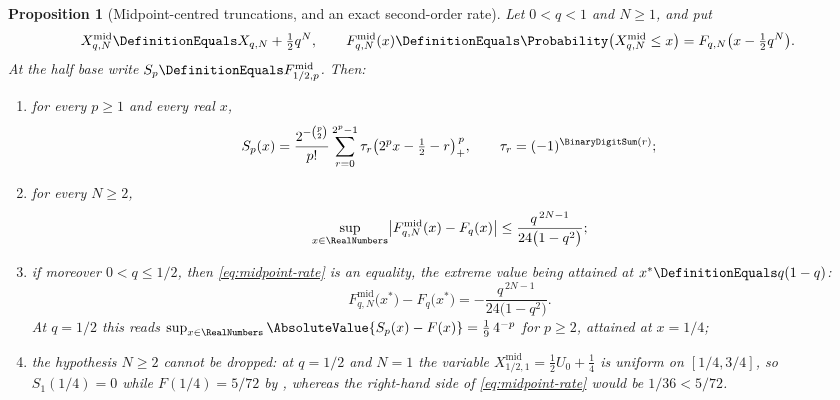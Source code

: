 \documentclass[11pt,a4paper,oneside,openany]{book}
\newtheorem{proposition}[proposition]{Proposition}
\theoremstyle{definition}
\theoremstyle{remark}
\begin{document}
\begin{proposition}[Midpoint-centred truncations, and an exact second-order rate]\label{prop:midpoint-truncation}
Let $0<q<1$ and $N\ge1$, and put
\begin{equation}\label{eq:midpoint-truncation-def}
 X_{q,N}^{\mathrm{mid}}\DefinitionEquals X_{q,N}+\tfrac12q^N,
 \qquad
 F_{q,N}^{\mathrm{mid}}(x)\DefinitionEquals\Probability\bigl(X_{q,N}^{\mathrm{mid}}\le x\bigr)
  =F_{q,N}\bigl(x-\tfrac12q^N\bigr).
\end{equation}
At the half base write $S_p\DefinitionEquals F^{\mathrm{mid}}_{1/2,p}$.  Then:
\begin{enumerate}
\item for every $p\ge1$ and every real $x$,
\begin{equation}\label{eq:midpoint-spline}
 S_p(x)=\frac{2^{-\binom p2}}{p!}
  \sum_{r=0}^{2^p-1}\tau_r\bigl(2^px-\tfrac12-r\bigr)_+^{\,p},
 \qquad \tau_r=(-1)^{\BinaryDigitSum(r)};
\end{equation}
\item for every $N\ge2$,
\begin{equation}\label{eq:midpoint-rate}
 \sup_{x\in\RealNumbers}\bigl|F^{\mathrm{mid}}_{q,N}(x)-F_q(x)\bigr|
 \le\frac{q^{\,2N-1}}{24\bigl(1-q^{2}\bigr)};
\end{equation}
\item if moreover $0<q\le1/2$, then \eqref{eq:midpoint-rate} is an equality, the
extreme value being attained at $x^\ast\DefinitionEquals q(1-q)$:
\begin{equation}\label{eq:midpoint-extremum}
 F^{\mathrm{mid}}_{q,N}\bigl(x^\ast\bigr)-F_q\bigl(x^\ast\bigr)
 =-\frac{q^{\,2N-1}}{24\bigl(1-q^{2}\bigr)} .
\end{equation}
At $q=1/2$ this reads
$\sup_{x\in\RealNumbers}\AbsoluteValue{S_p(x)-F(x)}=\tfrac19\,4^{-p}$ for $p\ge2$, attained at
$x=1/4$;
\item the hypothesis $N\ge2$ cannot be dropped: at $q=1/2$ and $N=1$ the variable
$X^{\mathrm{mid}}_{1/2,1}=\tfrac12U_0+\tfrac14$ is uniform on $[1/4,3/4]$, so
$S_1(1/4)=0$ while $F(1/4)=5/72$ by ,
whereas the right-hand side of \eqref{eq:midpoint-rate} would be $1/36<5/72$.
\end{enumerate}
\end{proposition}
\end{document}
